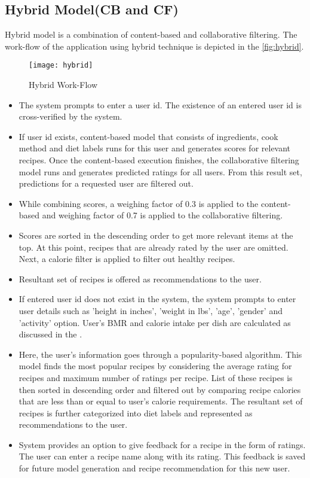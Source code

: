 \subsection{Hybrid Model(CB and CF)}
\label{sec:hybrid_impl}
Hybrid model is a combination of content-based and collaborative filtering. The work-flow of the application using hybrid technique is depicted in the \autoref{fig:hybrid}.
\begin{figure}[H]
	\centering
	\texttt{[image: hybrid]}
	\caption{Hybrid Work-Flow }
	\label{fig:hybrid}
\end{figure}  
\begin{itemize}
\item The system prompts to enter a user id. The existence of an entered user id is cross-verified by the system.
\item If user id exists, content-based model that consists of ingredients, cook method and diet labels runs for this user and generates scores for relevant recipes. Once the content-based execution finishes, the collaborative filtering model runs and generates predicted ratings for all users. From this result set, predictions for a requested user are filtered out. 
\item While combining scores, a weighing factor of 0.3 is applied to the content-based and weighing factor of 0.7 is applied to the collaborative filtering.
\item Scores are sorted in the descending order to get more relevant items at the top. At this point, recipes that are already rated by the user are omitted. Next, a calorie filter is applied to filter out healthy recipes.
\item Resultant set of recipes is offered as recommendations to the user.
\item If entered user id does not exist in the system, the system prompts to enter user details such as 'height in inches', 'weight in lbs', 'age', 'gender' and 'activity' option. User's BMR and calorie intake per dish are calculated as discussed in the . 
\item Here, the user's information goes through a popularity-based algorithm. This model finds the most popular recipes by considering the average rating for recipes and maximum number of ratings per recipe. List of these recipes is then sorted in descending order and filtered out by comparing recipe calories that are less than or equal to user's calorie requirements. The resultant set of recipes is further categorized into diet labels and represented as recommendations to the user.
\item System provides an option to give feedback for a recipe in the form of ratings. The user can enter a recipe name along with its rating. This feedback is saved for future model generation and recipe recommendation for this new user.
\end{itemize}
